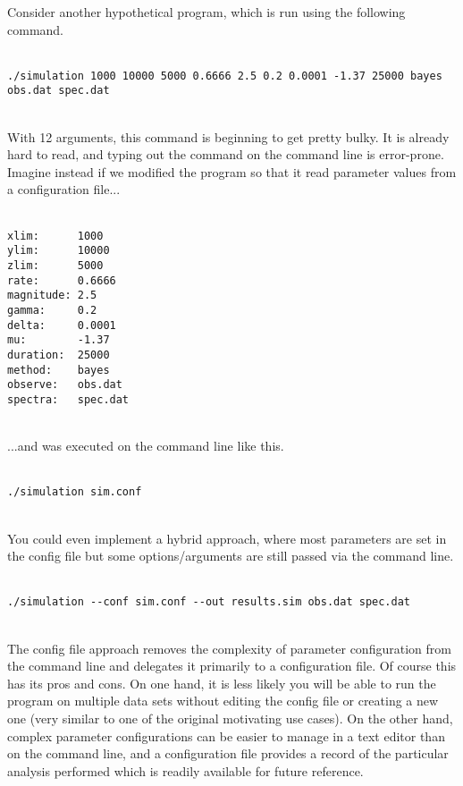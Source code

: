\documentclass{article}
\begin{document}
Consider another hypothetical program, which is run using the following command.
\\ \\
\begin{verbatim}
./simulation 1000 10000 5000 0.6666 2.5 0.2 0.0001 -1.37 25000 bayes obs.dat spec.dat
\end{verbatim}
\\
With 12 arguments, this command is beginning to get pretty bulky.
It is already hard to read, and typing out the command on the command line is error-prone.
Imagine instead if we modified the program so that it read parameter values from a configuration file...
\\ \\
\begin{verbatim}
xlim:      1000
ylim:      10000
zlim:      5000
rate:      0.6666
magnitude: 2.5
gamma:     0.2
delta:     0.0001
mu:        -1.37
duration:  25000
method:    bayes
observe:   obs.dat
spectra:   spec.dat
\end{verbatim}
\\
...and was executed on the command line like this.
\\ \\
\begin{verbatim}
./simulation sim.conf
\end{verbatim}
\\
You could even implement a hybrid approach, where most parameters are set in the config file but some options/arguments are still passed via the command line.
\\ \\
\begin{verbatim}
./simulation --conf sim.conf --out results.sim obs.dat spec.dat
\end{verbatim}
\\

The config file approach removes the complexity of parameter configuration from the command line and delegates it primarily to a configuration file. Of course this has its pros and cons. On one hand, it is less likely you will be able to run the program on multiple data sets without editing the config file or creating a new one (very similar to one of the original motivating use cases). On the other hand, complex parameter configurations can be easier to manage in a text editor than on the command line, and a configuration file provides a record of the particular analysis performed which is readily available for future reference.
\end{document}

